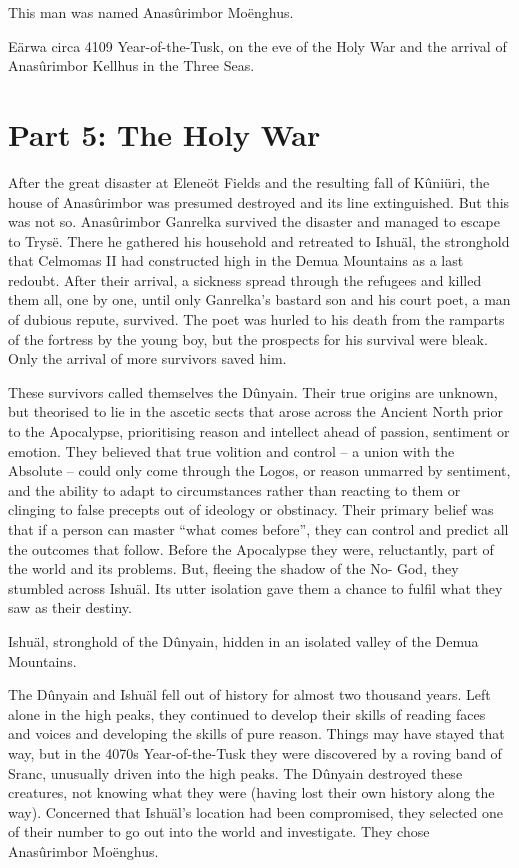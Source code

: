 \documentclass[]{book}
\begin{document}
This man was named Anasûrimbor Moënghus.

Eärwa circa 4109 Year-of-the-Tusk, on the eve of the Holy War and the arrival of Anasûrimbor Kellhus in the Three Seas.

\hypertarget{part-5-the-holy-war}{%
\chapter{Part 5: The Holy War}\label{part-5-the-holy-war}}

After the great disaster at Eleneöt Fields and the resulting fall of Kûniüri, the house of
Anasûrimbor was presumed destroyed and its line extinguished. But this was not so.
Anasûrimbor Ganrelka survived the disaster and managed to escape to Trysë. There he
gathered his household and retreated to Ishuäl, the stronghold that Celmomas II had
constructed high in the Demua Mountains as a last redoubt. After their arrival, a
sickness spread through the refugees and killed them all, one by one, until only
Ganrelka's bastard son and his court poet, a man of dubious repute, survived. The poet
was hurled to his death from the ramparts of the fortress by the young boy, but the
prospects for his survival were bleak. Only the arrival of more survivors saved him.

These survivors called themselves the Dûnyain. Their true origins are unknown, but
theorised to lie in the ascetic sects that arose across the Ancient North prior to the
Apocalypse, prioritising reason and intellect ahead of passion, sentiment or emotion.
They believed that true volition and control -- a union with the Absolute -- could only
come through the Logos, or reason unmarred by sentiment, and the ability to adapt to
circumstances rather than reacting to them or clinging to false precepts out of ideology
or obstinacy. Their primary belief was that if a person can master ``what comes before'',
they can control and predict all the outcomes that follow. Before the Apocalypse they
were, reluctantly, part of the world and its problems. But, fleeing the shadow of the No-
God, they stumbled across Ishuäl. Its utter isolation gave them a chance to fulfil what
they saw as their destiny.

Ishuäl, stronghold of the Dûnyain, hidden in an isolated valley of the Demua Mountains.

The Dûnyain and Ishuäl fell out of history for almost two thousand years. Left alone in
the high peaks, they continued to develop their skills of reading faces and voices and
developing the skills of pure reason. Things may have stayed that way, but in the 4070s
Year-of-the-Tusk they were discovered by a roving band of Sranc, unusually driven into
the high peaks. The Dûnyain destroyed these creatures, not knowing what they were
(having lost their own history along the way). Concerned that Ishuäl's location had
been compromised, they selected one of their number to go out into the world and
investigate. They chose Anasûrimbor Moënghus.
\end{document}
